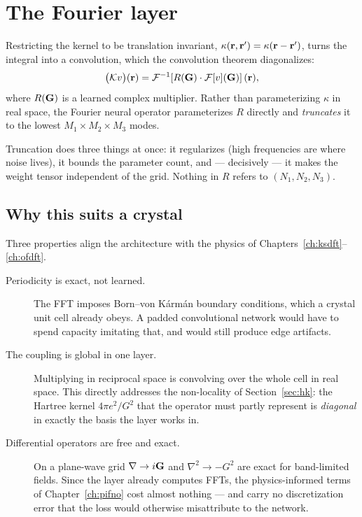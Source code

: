 \section{The Fourier layer}

Restricting the kernel to be translation invariant, $\kappa(\mathbf{r},\mathbf{r}')
= \kappa(\mathbf{r}-\mathbf{r}')$, turns the integral into a convolution, which the
convolution theorem diagonalizes:
\begin{equation}
  \bigl(\mathcal{K}v\bigr)(\mathbf{r})
    = \mathcal{F}^{-1}\!\left[ R(\mathbf{G})\cdot \mathcal{F}[v](\mathbf{G}) \right](\mathbf{r}),
  \label{eq:fourierlayer}
\end{equation}
where $R(\mathbf{G})$ is a learned complex multiplier. Rather than parameterizing
$\kappa$ in real space, the Fourier neural operator parameterizes $R$ directly
and \emph{truncates} it to the lowest $M_1{\times}M_2{\times}M_3$ modes.

Truncation does three things at once: it regularizes (high frequencies are
where noise lives), it bounds the parameter count, and --- decisively --- it
makes the weight tensor independent of the grid. Nothing in $R$ refers to
$(N_1,N_2,N_3)$.

\subsection{Why this suits a crystal}

Three properties align the architecture with the physics of
Chapters~\ref{ch:ksdft}--\ref{ch:ofdft}.

\begin{description}
  \item[Periodicity is exact, not learned.] The FFT imposes Born--von Kármán
    boundary conditions, which a crystal unit cell already obeys. A padded
    convolutional network would have to spend capacity imitating that, and
    would still produce edge artifacts.
  \item[The coupling is global in one layer.] Multiplying in reciprocal space
    is convolving over the whole cell in real space. This directly addresses
    the non-locality of Section~\ref{sec:hk}: the Hartree kernel
    $4\pi e^2/G^2$ that the operator must partly represent is
    \emph{diagonal} in exactly the basis the layer works in.
  \item[Differential operators are free and exact.] On a plane-wave grid
    $\nabla \to i\mathbf{G}$ and $\nabla^2 \to -G^2$ are exact for band-limited
    fields. Since the layer already computes FFTs, the physics-informed terms
    of Chapter~\ref{ch:pifno} cost almost nothing --- and carry no
    discretization error that the loss would otherwise misattribute to the
    network.
\end{description}

